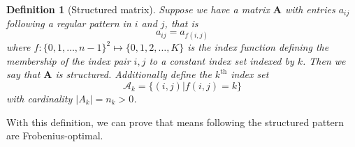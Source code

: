 \documentclass[letterpaper,12pt,oneside,final]{article}
\newtheorem{definition}{Definition}
\newcommand{\m}[1]{\mathbf{#1}}               %
\begin{document}
\begin{definition}[Structured matrix] \label{def:strucMat}
  Suppose we have a matrix $\m{A}$ with entries $a_{ij}$ following a regular pattern in $i$ and $j$, that is
  \begin{equation} \label{eq:generalStruc}
    a_{ij} = a_{f(i,j)}
  \end{equation}
  where $f:\{0,1, \dots, n-1\}^2 \mapsto \{0, 1, 2, \dots, K\}$ is the index function defining the membership of the index pair $i,j$ to a constant index set indexed by $k$. Then we say that $\m{A}$ is \emph{structured}. Additionally define the $k^{\text{th}}$ index set
  $$\mathcal{A}_k = \{(i,j) | f(i,j) = k\}$$
  with cardinality $\lvert A_k \rvert = n_k > 0$.
\end{definition}
With this definition, we can prove that means following the structured pattern are Frobenius-optimal.
\end{document}
